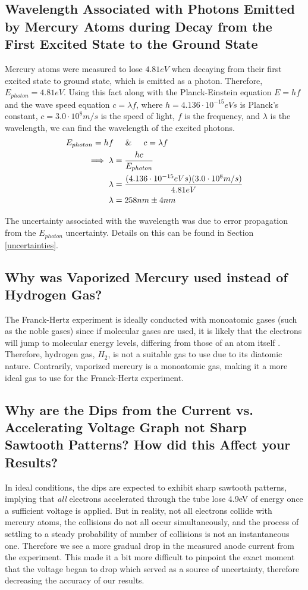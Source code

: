 \documentclass[12pt,twocolumn,letterpaper]{article}
\begin{document}
\subsection{Wavelength Associated with Photons Emitted by Mercury Atoms during Decay from the First Excited State to the Ground State} \label{q2}

Mercury atoms were measured to lose $4.81 eV$ when decaying from their first excited state to ground state, which is emitted as a photon. Therefore, $E_{photon}=4.81eV$. Using this fact along with the Planck-Einstein equation $E=hf$ and the wave speed equation $c=\lambda f$, where $h=4.136\cdot10^{-15}eVs$ is Planck's constant, $c=3.0\cdot10^8m/s$ is the speed of light, $f$ is the frequency, and $\lambda$ is the wavelength, we can find the wavelength of the excited photons.
\begin{align*}
    E_{photon} = hf &\hspace{0.5cm}\&\hspace{0.5cm}
    c = \lambda f\\
    \implies
    \lambda &= \frac{hc}{E_{photon}}\\
    \lambda &= \frac{(4.136\cdot10^{-15} eVs)(3.0\cdot10^8 m/s)}{4.81eV}\\
    \lambda &= 258 nm \pm 4 nm
\end{align*}

The uncertainty associated with the wavelength was due to error propagation from the $E_{photon}$ uncertainty. Details on this can be found in Section  \ref{uncertainties}.

\subsection{Why was Vaporized Mercury used instead of Hydrogen Gas?}
The Franck-Hertz experiment is ideally conducted with monoatomic gases (such as the noble gases) since if molecular gases are used, it is likely that the electrons will jump to molecular energy levels, differing from those of an atom itself \cite{modernphysics}. Therefore, hydrogen gas, $H_2$, is not a suitable gas to use due to its diatomic nature. Contrarily, vaporized mercury is a monoatomic gas, making it a more ideal gas to use for the Franck-Hertz experiment.

\subsection{Why are the Dips from the Current vs. Accelerating Voltage Graph not Sharp Sawtooth Patterns? How did this Affect your Results?}
In ideal conditions, the dips are expected to exhibit sharp sawtooth patterns, implying that \textit{all} electrons accelerated through the tube lose 4.9eV of energy once a sufficient voltage is applied. But in reality, not all electrons collide with mercury atoms, the collisions do not all occur simultaneously, and the process of settling to a steady probability of number of collisions is not an instantaneous one. Therefore we see a more gradual drop in the measured anode current from the experiment. This made it a bit more difficult to pinpoint the exact moment that the voltage began to drop which served as a source of uncertainty, therefore decreasing the accuracy of our results.
\end{document}
